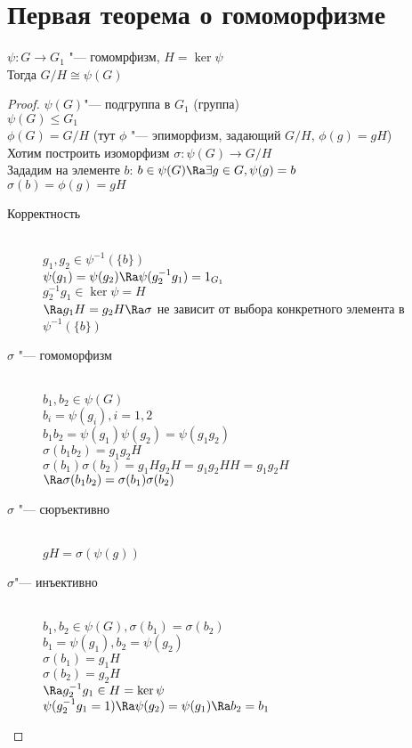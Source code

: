 ﻿\section{Первая теорема о гомоморфизме}
\begin{theorem}
$\psi \colon G \to G_1$ "--- гомомрфизм, $H = \ker \psi$\\
Тогда $G / H \cong \psi(G)$\\
\end{theorem}
\begin{proof}
$\psi(G)$"--- подгруппа в $G_1$ (группа)\\
$\psi(G) \le G_1$\\
$\phi(G) = G / H$ (тут $\phi$ "--- эпиморфизм, задающий $G/H$, $\phi(g) = gH$)\\
Хотим построить изоморфизм $\sigma\colon \psi(G) \to G / H$\\

Зададим на элементе $b$:
$b \in \psi(G) \Ra \exists g \in G, \psi(g) = b$\\
$\sigma(b) = \phi(g) = gH$\\
\begin{description}
\item[Корректность] \hfill \\
$g_1, g_2 \in \psi^{-1}(\{b\})$\\
$\psi(g_1) = \psi(g_2) \Ra \psi(g_2^{-1}g_1) = 1_{G_1}$\\
$g_2^{-1}g_1 \in \ker\psi = H$\\
$\Ra g_1H = g_2H \Ra \sigma$ не зависит от выбора конкретного элемента в $\psi^{-1}(\{b\})$\\
\item [$\sigma$ "--- гомоморфизм]\hfill \\
$b_1, b_2 \in \psi(G)$ \\
$b_i = \psi(g_i), i = 1,2$\\
$b_1b_2 = \psi(g_1)\psi(g_2) = \psi(g_1g_2)$\\
$\sigma(b_1b_2) = g_1g_2H$\\
$\sigma(b_1)\sigma(b_2) = g_1Hg_2H = g_1g_2HH = g_1g_2H$\\
$\Ra \sigma(b_1b_2) = \sigma(b_1)\sigma(b_2)$\\
\item [$\sigma$ "--- сюръективно]\hfill \\
$gH = \sigma(\psi(g))$\\
\item [$\sigma$"--- инъективно]\hfill \\
$b_1, b_2 \in \psi(G), \sigma(b_1) = \sigma(b_2)$\\
$b_1 = \psi(g_1), b_2 = \psi(g_2)$\\
$\sigma(b_1) = g_1H$\\
$\sigma(b_2) = g_2H$\\
$\Ra g_2^{-1}g_1 \in H = \ker \psi$\\
$\psi(g_2^{-1}g_1 = 1) \Ra \psi(g_2) = \psi(g_1) \Ra b_2 = b_1$\\
\end{description}
\end{proof}
